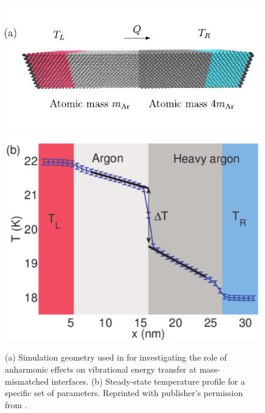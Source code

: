 \begin{figure}[tb]
 \begin{center}
  \includegraphics[width=.59\columnwidth]{pics/nemd_fig2a_2.pdf} 
  \includegraphics[width=.59\columnwidth]{pics/nemd_fig2b_2.pdf}
  \caption{(a) Simulation geometry used in  for investigating the role of anharmonic effects on vibrational energy transfer at mass-mismatched interfaces. (b) Steady-state temperature profile for a specific set of parameters. Reprinted with publisher's permission from .}  
\label{fig:th_spectral_geom}
 \end{center}
\end{figure}

